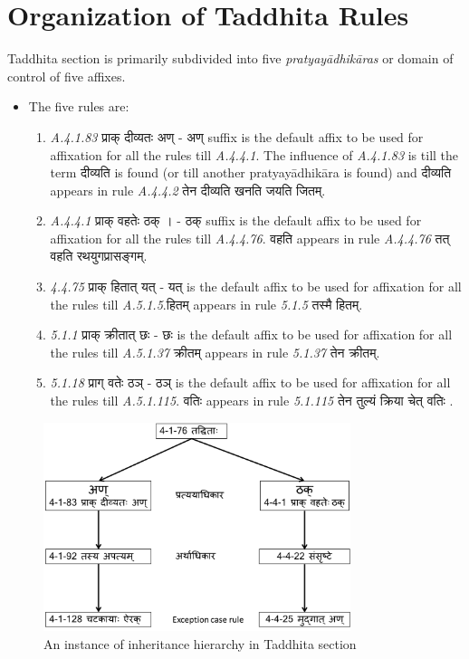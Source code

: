 \documentclass[a4paper,11pt,twoside,openright]{report}
\begin{document}
\section{Organization of Taddhita Rules}
\label{orgTad}
Taddhita section is primarily subdivided into five \textsl{ pratyayādhikāras} or domain of control
of five affixes.
\renewcommand{\labelitemi}{$\blacksquare$}
\begin{itemize}
  \item The five rules are:
\renewcommand{\labelenumi}{$\Roman{enumi}$}
\begin{enumerate}


  \item \textsl{ A.4.1.83} {\skt प्राक् दीव्यतः अण् } - {\skt अण् } suffix is the default affix to be used for affixation for all the rules till \textsl{ A.4.4.1}. The influence of \textsl{ A.4.1.83} is till the term {\skt दीव्यति} is found (or till another pratyayādhikāra is found) and {\skt दीव्यति} appears in rule \textsl{ A.4.4.2} {\skt  तेन दीव्यति खनति जयति जितम्}. 
  \item \textsl{ A.4.4.1} {\skt  प्राक् वहतेः ठक् । } - {\skt ठक् } suffix is the default affix to be used for affixation for all the rules till \textsl{ A.4.4.76}. {\skt  वहति} appears in rule \textsl{ A.4.4.76} {\skt तत् वहति रथयुगप्रासङ्गम्}.
  \item \textsl{ 4.4.75} {\skt प्राक् हितात् यत् } - {\skt यत् } is the default affix to be used for affixation for all the rules till \textsl{ A.5.1.5}.{\skt हितम्} appears in rule \textsl{ 5.1.5} {\skt  तस्मै हितम्}. 
  \item \textsl{ 5.1.1} {\skt  प्राक् क्रीतात् छः } - {\skt छः } is the default affix to be used for affixation for all the rules till \textsl{ A.5.1.37 }{\skt  क्रीतम्} appears in  rule \textsl{ 5.1.37} {\skt तेन क्रीतम्}.
  \item \textsl{ 5.1.18} {\skt प्राग् वतेः ठञ् } - {\skt ठञ् }is the default affix to be used for affixation for all the rules till \textsl{ A.5.1.115}. {\skt वतिः} appears in rule \textsl{ 5.1.115} {\skt  तेन तुल्यं क्रिया चेत् वतिः }. 
  
\end{enumerate}
\end{itemize}

\begin{figure}[h]
    \centering
	\includegraphics[width=0.8\textwidth]{tad}
    \caption{An instance of inheritance hierarchy in Taddhita section}
    \label{fig:inheritance}
\end{figure}
\end{document}
